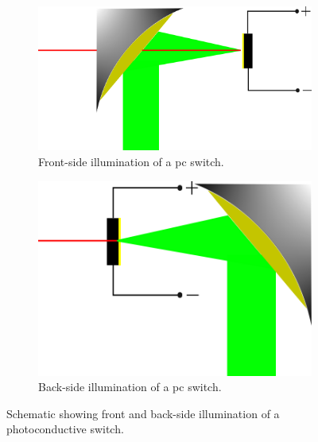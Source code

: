 \begin{figure}
\begin{subfigure}{0.49\textwidth}
    \centering
    \includegraphics[scale=1.5]{Figures/Misc/Theory/PCAFrontsideIllum.png}
    \caption{Front\nobreakdash-side illumination of a \acrshort{pc} switch.}
    \label{fig:fsillum}
\end{subfigure}
\begin{subfigure}{0.49\textwidth}
    \centering
    \includegraphics[scale=1.5]{Figures/Misc/Theory/PCABacksideIllum.png}
    \caption{Back\nobreakdash-side illumination of a \acrshort{pc} switch.}
    \label{fig:bsillum}
\end{subfigure}
\captionsetup{font = footnotesize, justification = centering}
\caption[Schematic showing Front and Back-Side Illumination of a Photoconductive Switch]{Schematic showing front and back-side illumination of a photoconductive switch.}
\label{fig:backandfrontillumination}
\end{figure}

